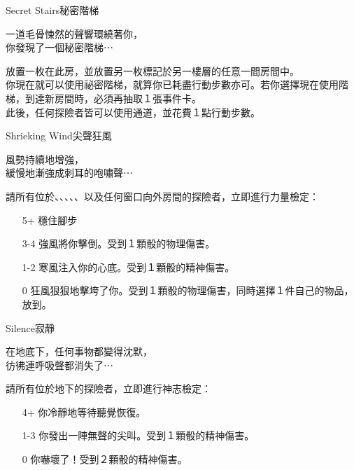 %
\begin{EventCard}{Secret Stairs}{秘密階梯}

  \begin{CardStory}
    一道毛骨悚然的聲響環繞著你，\\
    你發現了一個秘密階梯⋯
  \end{CardStory}

  放置一枚在此房，並放置另一枚標記於另一樓層的任意一間房間中。\\[0.5em]
  你現在就可以使用祕密階梯，就算你已耗盡行動步數亦可。若你選擇現在使用階梯，到達新房間時，必須再抽取１張事件卡。\\[0.5em]
  此後，任何探險者皆可以使用通道，並花費１點行動步數。\\[0.5em]

\end{EventCard}%
%
\begin{EventCard}{Shrieking Wind}{尖聲狂風}

  \begin{CardStory}
    風勢持續地增強，\\
    緩慢地漸強成刺耳的咆嘯聲⋯
  \end{CardStory}

  請所有位於、、、、、以及任何窗口向外房間的探險者，立即進行力量檢定：
  \begin{itemize}
    \item[5+] 穩住腳步
    \item[3-4] 強風將你擊倒。受到１顆骰的物理傷害。
    \item[1-2] 寒風注入你的心底。受到１顆骰的精神傷害。
    \item[0] 狂風狠狠地擊垮了你。受到１顆骰的物理傷害，同時選擇１件自己的物品，放到。
  \end{itemize}

\end{EventCard}%
%
\begin{EventCard}{Silence}{寂靜}

  \begin{CardStory}
    在地底下，任何事物都變得沈默，\\
    彷彿連呼吸聲都消失了⋯
  \end{CardStory}

  請所有位於地下的探險者，立即進行神志檢定：
  \begin{itemize}
    \item[4+] 你冷靜地等待聽覺恢復。
    \item[1-3] 你發出一陣無聲的尖叫。受到１顆骰的精神傷害。
    \item[0] 你嚇壞了！受到２顆骰的精神傷害。
  \end{itemize}

\end{EventCard}%
